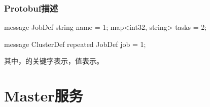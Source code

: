 \begin{content}
\subsubsection{Protobuf描述}

\begin{leftbar}
\begin{python}
message JobDef {
  string name = 1;
  map<int32, string> tasks = 2;
}

message ClusterDef {
  repeated JobDef job = 1;
}
\end{python}
\end{leftbar}

其中，的关键字表示，值表示。

\end{content}

\section{Master服务}

